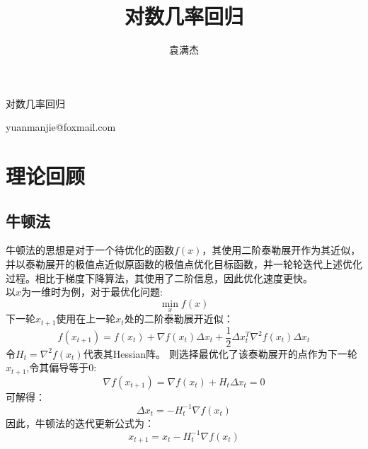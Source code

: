\documentclass{SCIS2020cn}
\begin{document}
\DOI{}
\ReceiveDate{}
\ReviseDate{}
\AcceptDate{}
\OnlineDate{}

\title{对数几率回归}{对数几率回归}


\author[1]{袁满杰}{{yuanmanjie@foxmail.com}}


\address[1]{南京大学, 南京 210023}







\maketitle

\section{理论回顾}

\subsection{牛顿法 }
牛顿法的思想是对于一个待优化的函数$f(x)$，其使用二阶泰勒展开作为其近似，并以泰勒展开的极值点近似原函数的极值点优化目标函数，并一轮轮迭代上述优化过程。相比于梯度下降算法，其使用了二阶信息，因此优化速度更快。
\\以$x$为一维时为例，对于最优化问题:
\begin{equation*}
    \min_x f(x)
\end{equation*}
下一轮$x_{t+1}$使用在上一轮$x_t$处的二阶泰勒展开近似：
\begin{equation*}
    f(x_{t+1})=f(x_t)+\nabla f(x_t)\Delta x_t+\frac{1}{2}\Delta x_t^T \nabla^2f(x_t) \Delta x_t
\end{equation*}
令$H_t=\nabla^2f(x_t)$代表其Hessian阵。 则选择最优化了该泰勒展开的点作为下一轮$x_{t+1}$,令其偏导等于0:
\begin{equation*}
    {\nabla f(x_{t+1})}=\nabla f(x_t)+H_t\Delta x_t =0
\end{equation*}
可解得：
\begin{equation*}
    \Delta x_t =-H_t^{-1}\nabla f(x_t)
\end{equation*}
因此，牛顿法的迭代更新公式为：
\begin{equation}
    x_{t+1}=x_t-H_t^{-1}\nabla f(x_t)
\end{equation}
\end{document}
